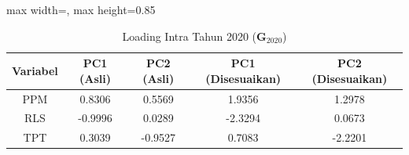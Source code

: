 \begin{table}[H]
\centering
\caption{Loading Intra Tahun 2020 ($\mathbf{G}_{2020}$)} \label{tab:sample1loading_intra_2020}
\begin{adjustbox}{max width=\textwidth, max height=0.85\textheight}
\begin{tabular}{|c|c|c|c|c|}
\hline
\textbf{Variabel} & \textbf{PC1 (Asli)} & \textbf{PC2 (Asli)} & \textbf{PC1 (Disesuaikan)} & \textbf{PC2 (Disesuaikan)} \\
\hline
PPM & 0.8306 & 0.5569 & 1.9356 & 1.2978 \\
RLS & -0.9996 & 0.0289 & -2.3294 & 0.0673 \\
TPT & 0.3039 & -0.9527 & 0.7083 & -2.2201 \\
\hline
\end{tabular}
\end{adjustbox}
\end{table}